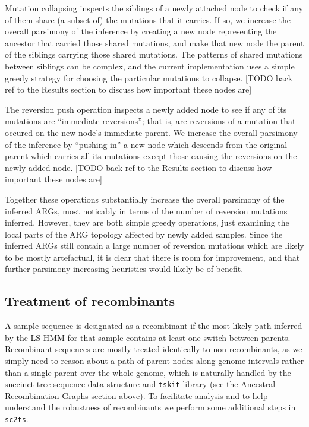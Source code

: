 \documentclass{article}
\begin{document}
Mutation collapsing inspects the siblings of a newly attached node
to check if any of them share (a subset of) the mutations that
it carries. If so, we increase the overall parsimony of the inference
by creating a new node representing the ancestor that carried
those shared mutations, and make that new node the parent of the
siblings carrying those shared mutations. The patterns of
shared mutations between siblings can be complex, and the current
implementation uses a simple greedy strategy for choosing
the particular mutations to collapse. [TODO back ref to the
Results section to discuss how important these nodes are]

The reversion push operation inspects a newly added node to see
if any of its mutations are ``immediate reversions''; that is,
are reversions of a mutation that occured on the new node's
immediate parent. We increase the overall parsimony of the
inference by ``pushing in'' a new node which descends from the
original parent which carries all its mutations except those
causing the reversions on the newly added node.
[TODO back ref to the
Results section to discuss how important these nodes are]

Together these operations substantially increase the overall parsimony
of the inferred ARGs, most noticably in terms of the number of
reversion mutations inferred. However, they are both simple
greedy operations, just examining the local parts of the
ARG topology affected by newly added samples. Since the inferred
ARGs still contain a large number of reversion mutations which
are likely to be mostly artefactual, it is clear that there
is room for improvement, and that further parsimony-increasing
heuristics would likely be of benefit.

\subsection{Treatment of recombinants}
A sample sequence is designated as a recombinant if the most likely
path inferred by the LS HMM for that sample contains at least
one switch between parents. Recombinant sequences are mostly treated
identically to non-recombinants, as we simply need to reason about
a path of parent nodes along genome intervals rather than a
single parent over the whole genome, which is naturally handled by
the succinct tree sequence data structure and \texttt{tskit} library
(see the Ancestral Recombination Graphs section above). To facilitate
analysis and to help understand the robustness of recombinants
we perform some additional steps in \texttt{sc2ts}.
\end{document}

